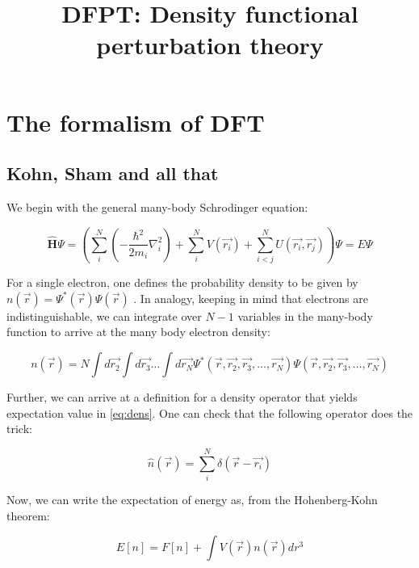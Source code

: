 \documentclass[]{article}
\title{DFPT: Density functional perturbation theory}
\author{}
\begin{document}
\maketitle



\section{The formalism of DFT}
        \subsection{Kohn, Sham and all that}

        We begin with the general many-body Schrodinger equation:

        \begin{equation} \label{eq:schrod}
          \bm{\widehat{H}}\Psi = \left( \sum_{i}^{N} \left(-\frac{\hbar^2}{2m_i}\nabla_i^2\right)
            + \sum_{i}^{N}V(\vec{r_i}) + \sum_{i<j}^{N}U(\vec{r_i}, \vec{r_j})\right)\Psi = E\Psi
        \end{equation}

        For a single electron, one defines the probability density to be given by
        $n(\vec{r}) = \Psi^*(\vec{r})\Psi(\vec{r})$ . In analogy, keeping in mind
        that electrons are indistinguishable, we can integrate over $N-1$ variables
        in the many-body function to arrive at the many body electron density:

        \begin{equation} \label{eq:dens}
          n(\vec{r}) = N\int d\vec{r_2}\int d\vec{r_3} \ldots \int d\vec{r_N}
          \Psi^*(\vec{r}, \vec{r_2}, \vec{r_3}, \ldots, \vec{r_N})  \Psi(\vec{r},
          \vec{r_2}, \vec{r_3}, \ldots, \vec{r_N})
        \end{equation}

        Further, we can arrive at a definition for a density operator that yields
        expectation value in \ref{eq:dens}. One can check that the following operator
        does the trick:

        \begin{equation} \label{eq:density}
                \widehat{n}(\vec{r}) = \sum_{i}^{N} \delta(\vec{r} - \vec{r_i})
        \end{equation}

        Now, we can write the expectation of energy as, from the Hohenberg-Kohn theorem:

        \begin{equation} \label{eq:funcham}
                E[n] = F[n] + \int V(\vec{r}) n(\vec{r}) dr^3
        \end{equation}
\end{document}
